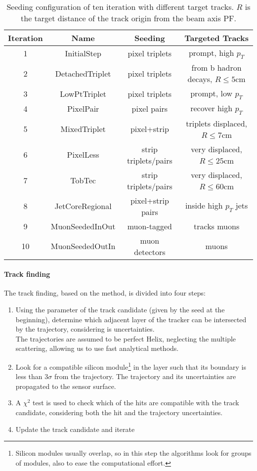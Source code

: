 \begin{table}[h!]
    \centering
    \begin{tabular}{|c|c|c|c|}
    \hline
    Iteration&Name&Seeding&Targeted Tracks\\
    \hline
    1& InitialStep&pixel triplets&prompt, high $p_T$\\
    2& DetachedTriplet&pixel triplets&from b hadron decays, $R\leq 5$cm\\
    3& LowPtTriplet&pixel triplets&prompt, low $p_T$\\
    4& PixelPair&pixel pairs&recover high $p_T$\\
    5& MixedTriplet&pixel+strip&triplets displaced, $R\leq 7$cm\\
    6& PixelLess&strip triplets/pairs&very displaced, $R\leq 25$cm\\
    7& TobTec&strip triplets/pairs&very displaced, $R\leq 60$cm\\
    8& JetCoreRegional&pixel+strip pairs&inside high $p_T$ jets\\
    9& MuonSeededInOut&muon-tagged&tracks muons\\
    10& MuonSeededOutIn&muon detectors&muons \\
    \hline
    \end{tabular}
    \caption{Seeding configuration of ten iteration with different target tracks. $R$ is the target distance of the track origin from the beam axis \ADDREF PF. }
    \label{tab:track_seeding}
\end{table}

\paragraph*{Track finding}
The track finding, based on the method, is divided into four steps:
\begin{enumerate}
    \item Using the parameter of the track candidate (given by the seed at the beginning), determine which adjacent layer of the tracker can be intersected by the trajectory, considering is uncertainties.\\ The trajectories are assumed to be perfect Helix, neglecting the multiple scattering, allowing us to use fast analytical methods.
    \item Look for a compatible silicon module\footnote{Silicon modules usually overlap, so in this step the algorithms look for groups of modules, also to ease the computational effort.} in the layer such that its boundary is less than $3 \sigma$ from the trajectory. The trajectory and its uncertainties are propagated to the sensor surface.
    \item A $\chi^2$ test is used to check which of the hits are compatible with the track candidate, considering both the hit and the trajectory uncertainties.
    \item Update the track candidate and iterate
\end{enumerate}

